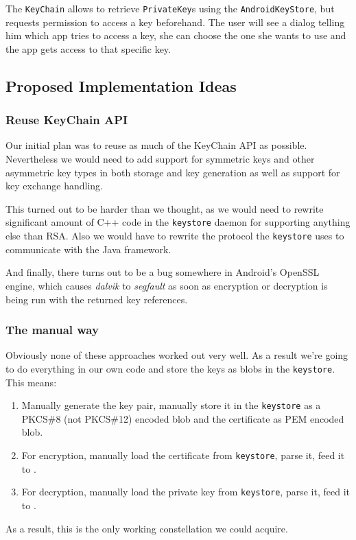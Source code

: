 \documentclass[a4paper,draft]{scrartcl}
\begin{document}
		The \texttt{KeyChain} allows to retrieve \texttt{PrivateKey}s using the \texttt{AndroidKeyStore}, but requests
		permission to access a key beforehand. The user will see a dialog telling him which app tries to access a key,
		she can choose the one she wants to use and the app gets access to that specific key.

	\subsection{Proposed Implementation Ideas}
		\subsubsection{Reuse KeyChain API}
			Our initial plan was to reuse as much of the KeyChain API as possible. Nevertheless we would need to add support
			for symmetric keys and other asymmetric key types in both storage and key generation as well as support for key
			exchange handling.

			This turned out to be harder than we thought, as we would need to rewrite significant amount of C++ code in the
			\texttt{keystore} daemon for supporting anything else than RSA. Also we would have to rewrite the protocol the
			\texttt{keystore} uses to communicate with the Java framework.

			And finally, there turns out to be a bug somewhere in Android's OpenSSL engine, which causes {\em dalvik} to
			{\em segfault} as soon as encryption or decryption is being run with the returned key references.

		\subsubsection{The manual way}
			Obviously none of these approaches worked out very well. As a result we're going to do everything in our own code and store the keys as blobs in the \texttt{keystore}. This means:
			\begin{enumerate}
				\item Manually generate the key pair, manually store it in the \texttt{keystore} as a PKCS\#8 (not PKCS\#12) encoded blob and the certificate as PEM encoded blob.
				\item For encryption, manually load the certificate from \texttt{keystore}, parse it, feed it to .
				\item For decryption, manually load the private key from \texttt{keystore}, parse it, feed it to .
			\end{enumerate}
			As a result, this is the only working constellation we could acquire.
\end{document}
